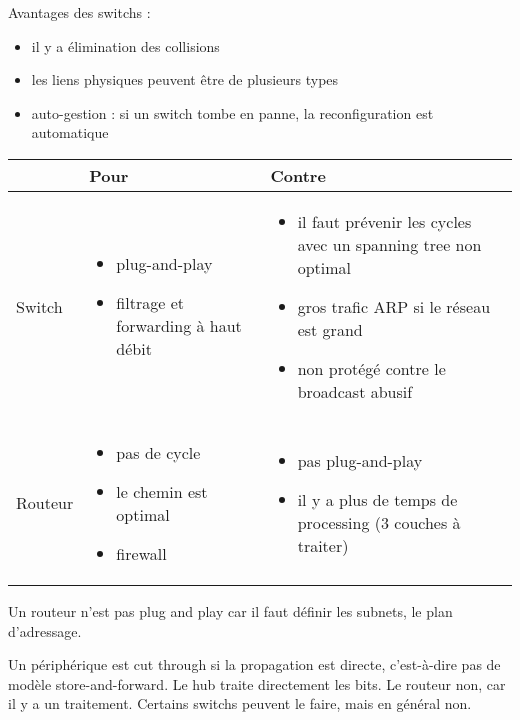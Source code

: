 

Avantages des switchs :

\begin{itemize}
	\item il y a élimination des collisions
	\item les liens physiques peuvent être de plusieurs types
	\item auto-gestion : si un switch tombe en panne, la reconfiguration est automatique
\end{itemize}

\begin{center}
\begin{tabular}{|p{1.5cm}|p{4cm}|p{4cm}|}
\hline  & Pour & Contre \\ 
\hline Switch & 
\begin{itemize}
\item plug-and-play
\item filtrage et forwarding à haut débit
\end{itemize} & 
\begin{itemize}
\item il faut prévenir les cycles avec un spanning tree non optimal
\item gros trafic ARP si le réseau est grand
\item non protégé contre le broadcast abusif
\end{itemize}
\\ 
\hline Routeur & 
\begin{itemize}
\item pas de cycle
\item le chemin est optimal
\item firewall
\end{itemize}
& 
\begin{itemize}
\item pas plug-and-play
\item il y a plus de temps de processing (3 couches à traiter)
\end{itemize}
\\ 
\hline 
\end{tabular} 
\end{center}

Un routeur n'est pas plug and play car il faut définir les subnets, le plan d'adressage.

Un périphérique est cut through si la propagation est directe, c'est-à-dire pas de modèle store-and-forward. Le hub traite directement les bits. Le routeur non, car il y a un traitement. Certains switchs peuvent le faire, mais en général non.

